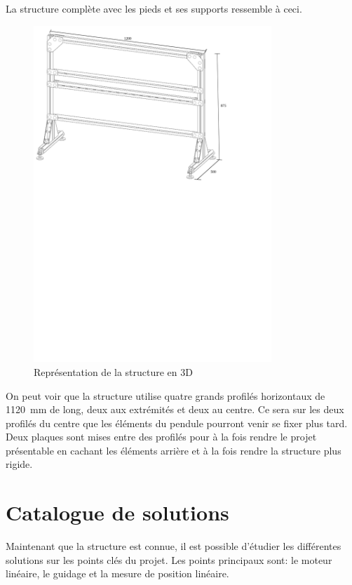 La structure complète avec les pieds et ses supports ressemble à ceci.
\begin{figure}[H]
  \centering
  \includegraphics[width = 0.8\textwidth]{assets/figures/Structure.svg}
  \caption{Représentation de la structure en 3D}
  \label{fig:DescStruct}
\end{figure}

On peut voir que la structure utilise quatre grands profilés horizontaux de 1120~mm de long, deux aux extrémités et deux au centre. Ce sera sur les deux profilés du centre que
les éléments du pendule pourront venir se fixer plus tard. Deux plaques sont mises entre des profilés pour à la fois rendre le projet présentable
en cachant les éléments arrière et à la fois rendre la structure plus rigide.

\section{Catalogue de solutions}\label{sec:CatSol}
Maintenant que la structure est connue, il est possible d'étudier les différentes solutions sur les points clés du projet.
Les points principaux sont: le moteur linéaire, le guidage et la mesure de position linéaire.\\

